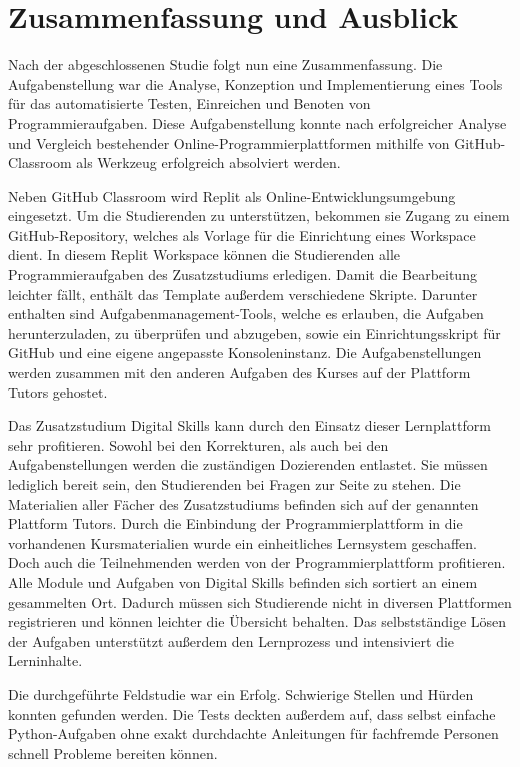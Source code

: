 \section{Zusammenfassung und Ausblick}\label{zusammenfassung-u-ausblick}
Nach der abgeschlossenen Studie folgt nun eine Zusammenfassung. Die
Aufgabenstellung war die Analyse, Konzeption und Implementierung eines Tools
für das automatisierte Testen, Einreichen und Benoten von Programmieraufgaben.
Diese Aufgabenstellung konnte nach erfolgreicher Analyse und Vergleich
bestehender Online-Programmierplattformen mithilfe von GitHub-Classroom als
Werkzeug erfolgreich absolviert werden.

Neben GitHub Classroom wird Replit als Online-Entwicklungsumgebung eingesetzt.
Um die Studierenden zu unterstützen, bekommen sie Zugang zu einem
GitHub-Repository, welches als Vorlage für die Einrichtung eines Workspace
dient. In diesem Replit Workspace können die Studierenden alle
Programmieraufgaben des Zusatzstudiums erledigen. Damit die Bearbeitung leichter
fällt, enthält das Template außerdem verschiedene Skripte. Darunter enthalten
sind Aufgabenmanagement-Tools, welche es erlauben, die Aufgaben herunterzuladen,
zu überprüfen und abzugeben, sowie ein Einrichtungsskript für GitHub und eine
eigene angepasste Konsoleninstanz. Die Aufgabenstellungen werden zusammen mit
den anderen Aufgaben des Kurses auf der Plattform Tutors gehostet.

Das Zusatzstudium Digital Skills kann durch den Einsatz dieser
Lernplattform sehr profitieren. Sowohl bei den Korrekturen, als auch bei den 
Aufgabenstellungen werden die zuständigen Dozierenden entlastet. Sie müssen
lediglich bereit sein, den Studierenden bei Fragen zur Seite zu stehen. Die
Materialien aller Fächer des Zusatzstudiums befinden sich auf der genannten
Plattform Tutors. Durch die Einbindung der Programmierplattform in die
vorhandenen Kursmaterialien wurde ein einheitliches Lernsystem geschaffen. Doch
auch die Teilnehmenden werden von der Programmierplattform profitieren. Alle
Module und Aufgaben von Digital Skills befinden sich sortiert an einem
gesammelten Ort. Dadurch müssen sich Studierende nicht in diversen Plattformen 
registrieren und können leichter die Übersicht behalten. Das selbstständige
Lösen der Aufgaben unterstützt außerdem den Lernprozess und intensiviert die
Lerninhalte.

Die durchgeführte Feldstudie war ein Erfolg. Schwierige Stellen und Hürden
konnten gefunden werden. Die Tests deckten außerdem auf, dass selbst einfache
Python-Aufgaben ohne exakt durchdachte Anleitungen für fachfremde Personen
schnell Probleme bereiten können.

